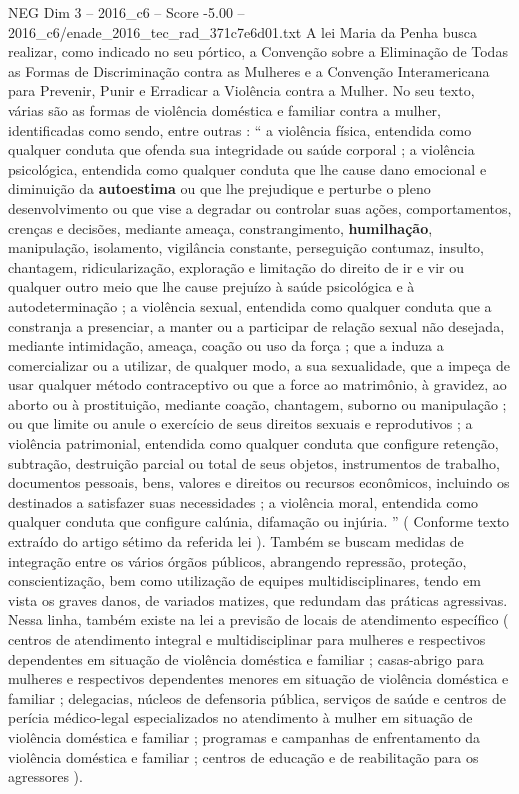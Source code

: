 \begin{textsample}{NEG Dim 3 – 2016\_c6 – Score -5.00 – 2016\_c6/enade\_2016\_tec\_rad\_371c7e6d01.txt}
A lei Maria da Penha busca realizar, como indicado no seu pórtico, a Convenção sobre a Eliminação de Todas as Formas de Discriminação contra as Mulheres e a Convenção Interamericana para Prevenir, Punir e Erradicar a Violência contra a Mulher.
No seu texto, várias são as formas de violência doméstica e familiar contra a mulher, identificadas como sendo, entre outras : “ a violência física, entendida como qualquer conduta que ofenda sua integridade ou saúde corporal ; a violência psicológica, entendida como qualquer conduta que lhe cause dano emocional e diminuição da \textbf{autoestima} ou que lhe prejudique e perturbe o pleno desenvolvimento ou que vise a degradar ou controlar suas ações, comportamentos, crenças e decisões, mediante ameaça, constrangimento, \textbf{humilhação}, manipulação, isolamento, vigilância constante, perseguição contumaz, insulto, chantagem, ridicularização, exploração e limitação do direito de ir e vir ou qualquer outro meio que lhe cause prejuízo à saúde psicológica e à autodeterminação ; a violência sexual, entendida como qualquer conduta que a constranja a presenciar, a manter ou a participar de relação sexual não desejada, mediante intimidação, ameaça, coação ou uso da força ; que a induza a comercializar ou a utilizar, de qualquer modo, a sua sexualidade, que a impeça de usar qualquer método contraceptivo ou que a force ao matrimônio, à gravidez, ao aborto ou à prostituição, mediante coação, chantagem, suborno ou manipulação ; ou que limite ou anule o exercício de seus direitos sexuais e reprodutivos ; a violência patrimonial, entendida como qualquer conduta que configure retenção, subtração, destruição parcial ou total de seus objetos, instrumentos de trabalho, documentos pessoais, bens, valores e direitos ou recursos econômicos, incluindo os destinados a satisfazer suas necessidades ; a violência moral, entendida como qualquer conduta que configure calúnia, difamação ou injúria. ” ( Conforme texto extraído do artigo sétimo da referida lei ).
Também se buscam medidas de integração entre os vários órgãos públicos, abrangendo repressão, proteção, conscientização, bem como utilização de equipes multidisciplinares, tendo em vista os graves danos, de variados matizes, que redundam das práticas agressivas.
Nessa linha, também existe na lei a previsão de locais de atendimento específico ( centros de atendimento integral e multidisciplinar para mulheres e respectivos dependentes em situação de violência doméstica e familiar ; casas-abrigo para mulheres e respectivos dependentes menores em situação de violência doméstica e familiar ; delegacias, núcleos de defensoria pública, serviços de saúde e centros de perícia médico-legal especializados no atendimento à mulher em situação de violência doméstica e familiar ; programas e campanhas de enfrentamento da violência doméstica e familiar ; centros de educação e de reabilitação para os agressores ).

\end{textsample}
